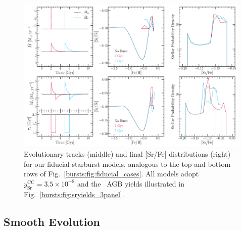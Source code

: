 \begin{figure} %
\includegraphics[scale = 0.31]{fiducial_bursts_sr.pdf}
\caption{
Evolutionary tracks (middle) and final [Sr/Fe] distributions (right) for our 
fiducial starburst models, analogous to the top and bottom rows of 
Fig.~\ref{bursts:fig:fiducial_cases}. All models adopt $y_\text{Sr}^\text{CC} = 
3.5\times10^{-8}$ and the~\citet{Cristallo2011} AGB yields illustrated in 
Fig.~\ref{bursts:fig:sryields_3panel}. 
}
\label{bursts:fig:bursts_srfe}
\end{figure}

\subsection{Smooth Evolution}
\label{bursts:sec:sr_enrich} 

